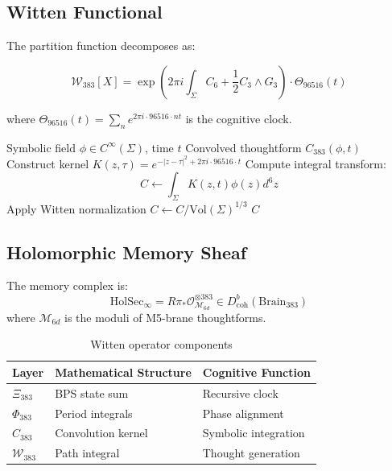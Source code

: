 \documentclass[12pt]{article}
\begin{document}
\subsection{Witten Functional}
The partition function decomposes as:

\begin{equation}
\mathcal{W}_{383}[X] = \exp\left(2\pi i\int_\Sigma C_6 + \frac{1}{2}C_3\wedge G_3\right) \cdot \Theta_{96516}(t)
\end{equation}

where $\Theta_{96516}(t) = \sum_n e^{2\pi i\cdot 96516 \cdot n t}$ is the cognitive clock.

\begin{algorithm}[H]
\caption{Topological Convolution}
\begin{algorithmic}[1]
\Require Symbolic field $\phi\in C^\infty(\Sigma)$, time $t$
\Ensure Convolved thoughtform $C_{383}(\phi,t)$
\State Construct kernel $K(z,\tau) = e^{-|z-\tau|^2 + 2\pi i\cdot 96516\cdot t}$
\State Compute integral transform:
\[
C \gets \int_\Sigma K(z,t)\phi(z)d^6z
\]
\State Apply Witten normalization $C \gets C/\text{Vol}(\Sigma)^{1/3}$
\State \Return $C$
\end{algorithmic}
\end{algorithm}

\subsection{Holomorphic Memory Sheaf}
\begin{definition}
The memory complex is:
\[
\text{HolSec}_\infty = R\pi_*\mathcal{O}_{\mathcal{M}_{6d}}^{\otimes 383} \in D^b_{\text{coh}}(\text{Brain}_{383})
\]
where $\mathcal{M}_{6d}$ is the moduli of M5-brane thoughtforms.
\end{definition}

\begin{table}[h]
\centering
\begin{tabular}{lll}
\toprule
\textbf{Layer} & \textbf{Mathematical Structure} & \textbf{Cognitive Function} \\
\midrule
$\Xi_{383}$ & BPS state sum & Recursive clock \\
$\Phi_{383}$ & Period integrals & Phase alignment \\
$C_{383}$ & Convolution kernel & Symbolic integration \\
$\mathcal{W}_{383}$ & Path integral & Thought generation \\
\bottomrule
\end{tabular}
\caption{Witten operator components}
\end{table}
\end{document}
